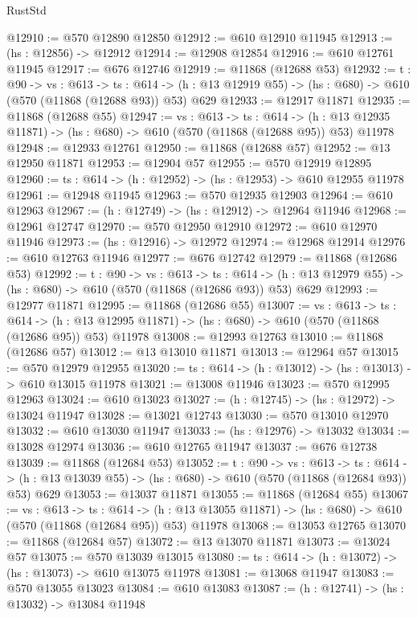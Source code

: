 \begin{lexlean}{RustStd}
\begin{coremodule}
@12910 := @570 @12890 @12850
@12912 := @610 @12910 @11945
@12913 := (hs : @12856) -> @12912
@12914 := @12908 @12854
@12916 := @610 @12761 @11945
@12917 := @676 @12746
@12919 := @11868 (@12688 @53)
@12932 := {t : @90} ->
  {vs : @613} ->
  {ts : @614} -> (h : @13 @12919 @55) -> (hs : @680) -> @610 (@570 (@11868 (@12688 @93)) @53) @629
@12933 := @12917 @11871
@12935 := @11868 (@12688 @55)
@12947 := {vs : @613} ->
  {ts : @614} ->
  (h : @13 @12935 @11871) -> (hs : @680) -> @610 (@570 (@11868 (@12688 @95)) @53) @11978
@12948 := @12933 @12761
@12950 := @11868 (@12688 @57)
@12952 := @13 @12950 @11871
@12953 := @12904 @57
@12955 := @570 @12919 @12895
@12960 := {ts : @614} -> (h : @12952) -> (hs : @12953) -> @610 @12955 @11978
@12961 := @12948 @11945
@12963 := @570 @12935 @12903
@12964 := @610 @12963
@12967 := (h : @12749) -> (hs : @12912) -> @12964 @11946
@12968 := @12961 @12747
@12970 := @570 @12950 @12910
@12972 := @610 @12970 @11946
@12973 := (hs : @12916) -> @12972
@12974 := @12968 @12914
@12976 := @610 @12763 @11946
@12977 := @676 @12742
@12979 := @11868 (@12686 @53)
@12992 := {t : @90} ->
  {vs : @613} ->
  {ts : @614} -> (h : @13 @12979 @55) -> (hs : @680) -> @610 (@570 (@11868 (@12686 @93)) @53) @629
@12993 := @12977 @11871
@12995 := @11868 (@12686 @55)
@13007 := {vs : @613} ->
  {ts : @614} ->
  (h : @13 @12995 @11871) -> (hs : @680) -> @610 (@570 (@11868 (@12686 @95)) @53) @11978
@13008 := @12993 @12763
@13010 := @11868 (@12686 @57)
@13012 := @13 @13010 @11871
@13013 := @12964 @57
@13015 := @570 @12979 @12955
@13020 := {ts : @614} -> (h : @13012) -> (hs : @13013) -> @610 @13015 @11978
@13021 := @13008 @11946
@13023 := @570 @12995 @12963
@13024 := @610 @13023
@13027 := (h : @12745) -> (hs : @12972) -> @13024 @11947
@13028 := @13021 @12743
@13030 := @570 @13010 @12970
@13032 := @610 @13030 @11947
@13033 := (hs : @12976) -> @13032
@13034 := @13028 @12974
@13036 := @610 @12765 @11947
@13037 := @676 @12738
@13039 := @11868 (@12684 @53)
@13052 := {t : @90} ->
  {vs : @613} ->
  {ts : @614} -> (h : @13 @13039 @55) -> (hs : @680) -> @610 (@570 (@11868 (@12684 @93)) @53) @629
@13053 := @13037 @11871
@13055 := @11868 (@12684 @55)
@13067 := {vs : @613} ->
  {ts : @614} ->
  (h : @13 @13055 @11871) -> (hs : @680) -> @610 (@570 (@11868 (@12684 @95)) @53) @11978
@13068 := @13053 @12765
@13070 := @11868 (@12684 @57)
@13072 := @13 @13070 @11871
@13073 := @13024 @57
@13075 := @570 @13039 @13015
@13080 := {ts : @614} -> (h : @13072) -> (hs : @13073) -> @610 @13075 @11978
@13081 := @13068 @11947
@13083 := @570 @13055 @13023
@13084 := @610 @13083
@13087 := (h : @12741) -> (hs : @13032) -> @13084 @11948

\end{coremodule}
\end{lexlean}
